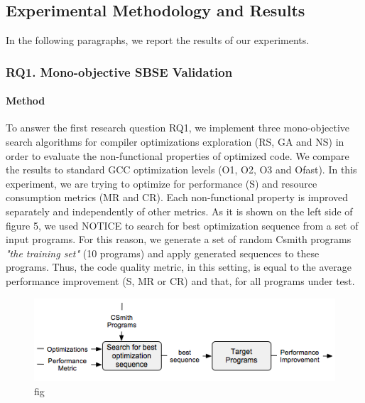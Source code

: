 \subsection{Experimental Methodology and Results}
In the following paragraphs, we report the results of our experiments.

\subsubsection{RQ1. Mono-objective SBSE Validation}
\paragraph{Method}
To answer the first research question RQ1, we implement three mono-objective search algorithms for compiler optimizations exploration (RS, GA and NS) in order to evaluate the non-functional properties of optimized code. We compare the results to standard GCC optimization levels (O1, O2, O3 and Ofast). 
In this experiment, we are trying to optimize for performance (S) and resource consumption metrics (MR and CR). Each non-functional property is improved separately and independently of other metrics. 
As it is shown on the left side of figure 5, we used NOTICE to search for best optimization sequence from a set of input programs. For this reason, we generate a set of random Csmith programs \textit{"the training set"} (10 programs) and apply generated sequences to these programs. Thus, the code quality metric, in this setting, is equal to the average performance improvement (S, MR or CR) and that, for all programs under test.







\begin{figure}[h]
	\centering
	\includegraphics[width=1.\linewidth]{Ressources/sensitivity.png}
	\caption{fig}
\end{figure}


